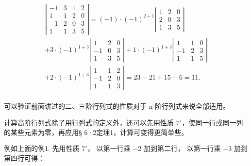 \[
\begin{array}{l} \left| \begin{array}{rrrr} - 1 & 3 & 1 & 2 \\ 1 & 1 & 2 & 0 \\ - 1 & 2 & 0 & 3 \\ 1 & 1 & 3 & 5 \end{array} \right| = (- 1) \cdot (- 1) ^ {2 + 1} \left| \begin{array}{rrr} 1 & 2 & 0 \\ 2 & 0 & 3 \\ 1 & 3 & 5 \end{array} \right| \\ + 3 \cdot (- 1) ^ {1 + 3} \left| \begin{array}{rrr} 1 & 2 & 0 \\ - 1 & 0 & 3 \\ 1 & 3 & 5 \end{array} \right| + 1 \cdot (- 1) ^ {1 + 3} \left| \begin{array}{rrr} 1 & 1 & 0 \\ - 1 & 2 & 3 \\ 1 & 1 & 5 \end{array} \right| \\ + 2 \cdot (- 1) ^ {1 + 3} \left| \begin{array}{rrr} 1 & 1 & 2 \\ - 1 & 2 & 0 \\ 1 & 1 & 3 \end{array} \right| = 23 - 21 + 15 - 6 = 11. \\ \end{array}
\]

可以验证前面讲过的二、三阶行列式的性质对于 n 阶行列式来说全部适用。

计算高阶行列式除了用行列式的定义外，还可以先用性质
\(7^{\circ}\)，使同一行或同一列的某些元素为零，再应用§
6·2定理1，计算可变得更简单些。

例如上面的例1. 先用性质 \(7^{\circ}\)， 以第一行乘 \(-2\) 加到第二行，
以第一行乘 \(-3\) 加到第四行可得：

